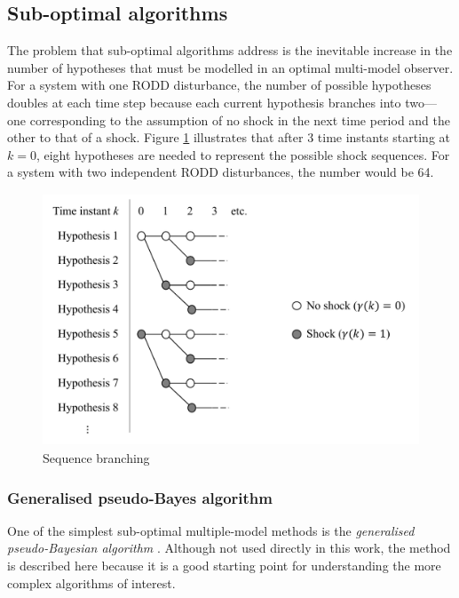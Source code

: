\subsection{Sub-optimal algorithms}

The problem that sub-optimal algorithms address is the inevitable increase in the number of hypotheses that must be modelled in an optimal multi-model observer. For a system with one RODD disturbance, the number of possible hypotheses doubles at each time step because each current hypothesis branches into two—one corresponding to the assumption of no shock in the next time period and the other to that of a shock. Figure \ref{fig:mm-obs-br} illustrates that after 3 time instants starting at $k=0$, eight hypotheses are needed to represent the possible shock sequences. For a system with two independent RODD disturbances, the number would be 64.

\begin{figure}[htp]
	\centering
	\includegraphics[height=7.5cm]{images/mm_obs_seq_br.pdf}
	\caption{Sequence branching}
	\label{fig:mm-obs-br}
\end{figure}

\subsubsection{Generalised pseudo-Bayes algorithm} \label{subsec-GPB}

One of the simplest sub-optimal multiple-model methods is the \textit{generalised pseudo-Bayesian algorithm} \citep{buxbaum_recursive_1969, jaffer_estimation_1971, tugnait_detection_1982}. Although not used directly in this work, the method is described here because it is a good starting point for understanding the more complex algorithms of interest.

